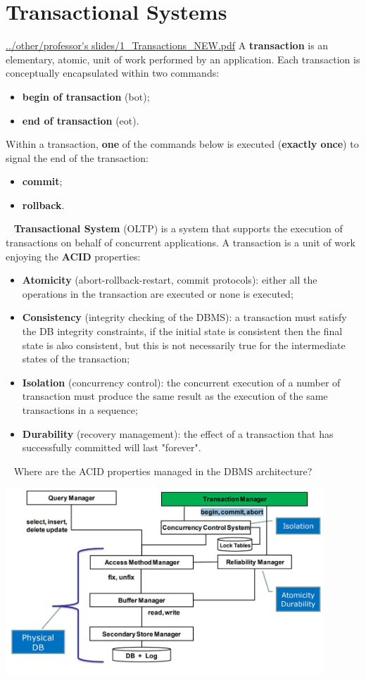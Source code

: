 \section{Transactional Systems}
\url{../other/professor's slides/1_Transactions_NEW.pdf}\newline
\newline
A \textbf{transaction} is an elementary, atomic, unit of work performed by an application.\newline
Each transaction is conceptually encapsulated within two commands:
\begin{itemize}
    \item \textbf{begin of transaction} (bot);
    \item \textbf{end of transaction} (eot).
\end{itemize}
Within a transaction, \textbf{one} of the commands below is executed (\textbf{exactly once}) to signal the end of the transaction:
\begin{itemize}
    \item \textbf{commit};
    \item \textbf{rollback}.
\end{itemize}
\ \newline
\textbf{Transactional System} (OLTP) is a system that supports the execution of transactions on behalf of concurrent applications.\newline
\newline
A transaction is a unit of work enjoying the \textbf{ACID} properties:
\begin{itemize}
    \item \textbf{Atomicity} (abort-rollback-restart, commit protocols): either all the operations in the transaction are executed or none is executed;
    \item \textbf{Consistency} (integrity checking of the DBMS): a transaction must satisfy the DB integrity constraints, if the initial state is consistent then the final state is also consistent, but this is not necessarily true for the intermediate states of the transaction;
    \item \textbf{Isolation} (concurrency control): the concurrent execution of a number of transaction must produce the same result as the execution of the same transactions in a sequence;
    \item \textbf{Durability} (recovery management): the effect of a transaction that has successfully committed will last "forever".
\end{itemize}
\ \newline
Where are the ACID properties managed in the DBMS architecture?
\begin{center}
    \includegraphics[height=7cm]{../arguments/ACIDandDBMSarchitectures.JPG}
\end{center}
